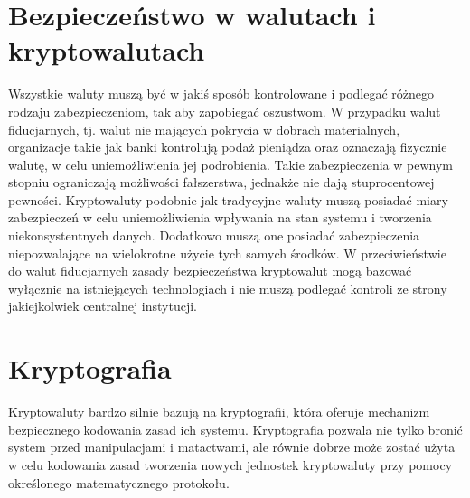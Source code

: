 \documentclass[12pt, twoside, final, openany]{mgr}
\begin{document}
\section{Bezpieczeństwo w walutach i kryptowalutach} \label{sec:bezpieczenstwoWwalutach}
\indent Wszystkie waluty muszą być w jakiś sposób kontrolowane i podlegać różnego rodzaju zabezpieczeniom, tak aby zapobiegać oszustwom. W przypadku walut fiducjarnych, tj. walut nie mających pokrycia w dobrach materialnych, organizacje takie jak banki kontrolują podaż pieniądza oraz oznaczają fizycznie walutę, w celu uniemożliwienia jej podrobienia. Takie zabezpieczenia w pewnym stopniu ograniczają możliwości fałszerstwa, jednakże nie dają stuprocentowej pewności. Kryptowaluty podobnie jak tradycyjne waluty muszą posiadać miary zabezpieczeń w celu uniemożliwienia wpływania na stan systemu i tworzenia niekonsystentnych danych. Dodatkowo muszą one posiadać zabezpieczenia niepozwalające na wielokrotne użycie tych samych środków. W przeciwieństwie do walut fiducjarnych zasady bezpieczeństwa kryptowalut mogą bazować wyłącznie na istniejących technologiach i nie muszą podlegać kontroli ze strony jakiejkolwiek centralnej instytucji\cite{elektrInstruBezEmitenta}.

\section{Kryptografia} \label{sec:kryptografia}
\indent Kryptowaluty bardzo silnie bazują na kryptografii, która oferuje mechanizm bezpiecznego kodowania zasad ich systemu. Kryptografia pozwala nie tylko bronić system przed manipulacjami i matactwami, ale równie dobrze może zostać użyta w celu kodowania zasad tworzenia nowych jednostek kryptowaluty przy pomocy określonego matematycznego protokołu\cite{Cryptocurrency}. 
\end{document}
